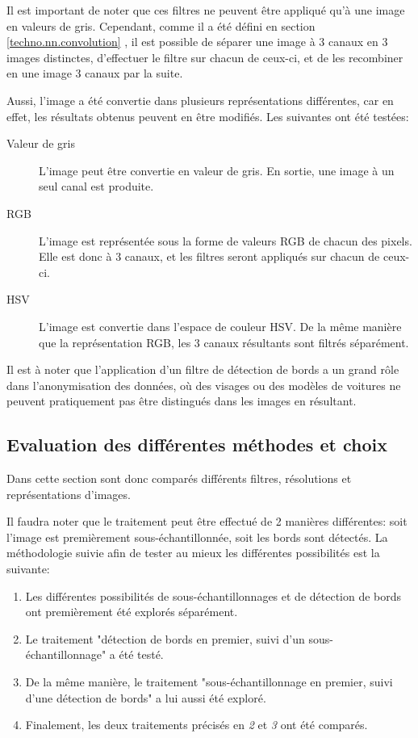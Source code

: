 Il est important de noter que ces filtres ne peuvent être appliqué qu'à une image en valeurs de gris. Cependant, comme il a été défini en section \ref{techno.nn.convolution} , il est possible de séparer une image à 3 canaux en 3 images distinctes, d'effectuer le filtre sur chacun de ceux-ci, et de les recombiner en une image 3 canaux par la suite. 

Aussi, l'image a été convertie dans plusieurs représentations différentes, car en effet, les résultats obtenus peuvent en être modifiés. Les suivantes ont été testées:
\begin{description}
    \item[Valeur de gris] L'image peut être convertie en valeur de gris. En sortie, une image à un seul canal est produite.
    \item[RGB] L'image est représentée sous la forme de valeurs RGB de chacun des pixels. Elle est donc à 3 canaux, et les filtres seront appliqués sur chacun de ceux-ci.
    \item[HSV] L'image est convertie dans l'espace de couleur HSV. De la même manière que la représentation RGB, les 3 canaux résultants sont filtrés séparément.
\end{description}

Il est à noter que l'application d'un filtre de détection de bords a un grand rôle dans l'anonymisation des données, où des visages ou des modèles de voitures ne peuvent pratiquement pas être distingués dans les images en résultant.

\subsection{Evaluation des différentes méthodes et choix}
Dans cette section sont donc comparés différents filtres, résolutions et représentations d'images. 

Il faudra noter que le traitement peut être effectué de 2 manières différentes: soit l'image est premièrement sous-échantillonnée, soit les bords sont détectés. La méthodologie suivie afin de tester au mieux les différentes possibilités est la suivante:
\begin{enumerate}
    \item Les différentes possibilités de sous-échantillonnages et de détection de bords ont premièrement été explorés séparément.
    \item Le traitement "détection de bords en premier, suivi d'un sous-échantillonnage" a été testé.
    \item De la même manière, le traitement "sous-échantillonnage en premier, suivi d'une détection de bords" a lui aussi été exploré.
    \item Finalement, les deux traitements précisés en \textit{2} et \textit{3} ont été comparés.
\end{enumerate}

